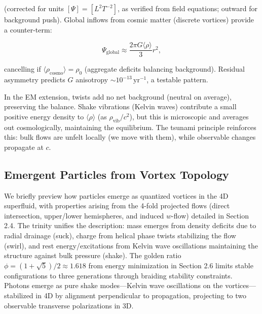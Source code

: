 (corrected for units $[\Psi] = [L^2 T^{-2}]$, as verified from field equations; outward for background push). Global inflows from cosmic matter (discrete vortices) provide a counter-term:

\begin{equation}
\Psi_{\text{global}} \approx \frac{2\pi G \langle \rho \rangle}{3} r^2,
\end{equation}

cancelling if $\langle \rho_\text{cosmo} \rangle = \rho_0$ (aggregate deficits balancing background). Residual asymmetry predicts $G$ anisotropy $\sim 10^{-13} \,\mathrm{yr}^{-1}$, a testable pattern.

In the EM extension, twists add no net background (neutral on average), preserving the balance. Shake vibrations (Kelvin waves) contribute a small positive energy density to $\langle \rho \rangle$ (as $\rho_{\text{vib}} / c^2$), but this is microscopic and averages out cosmologically, maintaining the equilibrium. The tsunami principle reinforces this: bulk flows are unfelt locally (we move with them), while observable changes propagate at $c$.

\medskip
\noindent
{}
\medskip

\subsection{Emergent Particles from Vortex Topology}

We briefly preview how particles emerge as quantized vortices in the 4D superfluid, with properties arising from the 4-fold projected flows (direct intersection, upper/lower hemispheres, and induced $w$-flow) detailed in Section 2.4. The trinity unifies the description: mass emerges from density deficits due to radial drainage (suck), charge from helical phase twists stabilizing the flow (swirl), and rest energy/excitations from Kelvin wave oscillations maintaining the structure against bulk pressure (shake). The golden ratio $\phi = (1 + \sqrt{5})/2 \approx 1.618$ from energy minimization in Section 2.6 limits stable configurations to three generations through braiding stability constraints. Photons emerge as pure shake modes---Kelvin wave oscillations on the vortices---stabilized in 4D by alignment perpendicular to propagation, projecting to two observable transverse polarizations in 3D.

